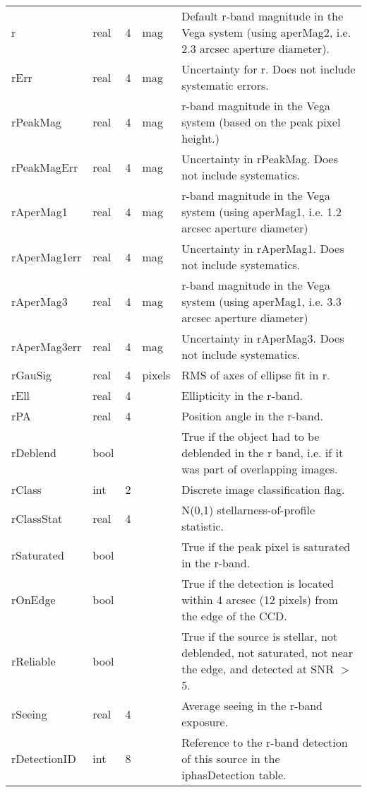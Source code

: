 \documentclass[12pt]{article}
\begin{document}
\begin{center}
\begin{longtable}{llclp{9cm}}
r & real & 4 & mag & Default r-band magnitude in the Vega system (using aperMag2, i.e. 2.3 arcsec aperture diameter). \\ 
rErr & real & 4 & mag & Uncertainty for r. Does not include systematic errors. \\ 
rPeakMag & real & 4 & mag & r-band magnitude in the Vega system (based on the peak pixel height.) \\ 
rPeakMagErr & real & 4 & mag & Uncertainty in rPeakMag. Does not include systematics. \\ 
rAperMag1 & real & 4 & mag & r-band magnitude in the Vega system (using aperMag1, i.e. 1.2 arcsec aperture diameter) \\ 
rAperMag1err & real & 4 & mag & Uncertainty in rAperMag1. Does not include systematics. \\ 
rAperMag3 & real & 4 & mag & r-band magnitude in the Vega system (using aperMag1, i.e. 3.3 arcsec aperture diameter) \\ 
rAperMag3err & real & 4 & mag & Uncertainty in rAperMag3. Does not include systematics. \\ 
rGauSig & real & 4 & pixels & RMS of axes of ellipse fit in r. \\ 
rEll & real & 4 & & Ellipticity in the r-band. \\
rPA & real & 4 & & Position angle in the r-band. \\
rDeblend & bool &  &  & True if the object had to be deblended in the r band, i.e. if it was part of overlapping images. \\ 
rClass & int & 2 & & Discrete image classification flag. \\
rClassStat & real & 4 & & N(0,1) stellarness-of-profile statistic. \\
rSaturated & bool &  &  & True if the peak pixel is saturated in the r-band. \\ 
rOnEdge & bool &  &  & True if the detection is located within 4 arcsec (12 pixels) from the edge of the CCD. \\ 
rReliable & bool & & & True if the source is stellar, not deblended, not saturated, not near the edge, and detected at SNR $>$ 5. \\
rSeeing & real & 4 & & Average seeing in the r-band exposure. \\
rDetectionID & int & 8 & & Reference to the r-band detection of this source in the iphasDetection table. \\



\end{longtable}
\end{center}
\end{document}
